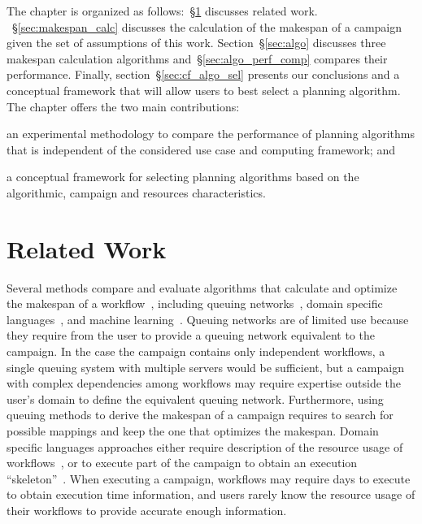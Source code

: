 The chapter is organized as follows:~\S\ref{sec:camp_rw} discusses related
work. ~\S\ref{sec:makespan_calc} discusses the
calculation of the makespan of a campaign given the set of assumptions of this
work. Section~\S\ref{sec:algo} discusses three makespan calculation algorithms
and~\S\ref{sec:algo_perf_comp} compares their performance. Finally,
section~\S\ref{sec:cf_algo_sel} presents our conclusions and a conceptual
framework that will allow users to best select a planning algorithm. The chapter
offers the two main contributions:
\begin{inparaenum}[(i)]
    \item an experimental methodology to compare the performance of planning
    algorithms that is independent of the considered use case and computing
    framework; and
    \item a conceptual framework for selecting planning algorithms based on the
    algorithmic, campaign and resources characteristics.
\end{inparaenum}


\section{Related Work}
\label{sec:camp_rw}

Several methods compare and evaluate algorithms that calculate and optimize the
makespan of a workflow~\cite{lu2019review}, including queuing
networks~\cite{yao2019throughput,bao2019performance}, domain specific
languages~\cite{carothers2017durango,maheshwari2016workflow}, and machine
learning~\cite{witt2019predictive,pumma2017runtime}. Queuing networks are of
limited use because they require from the user to provide a queuing network
equivalent to the campaign. In the case the campaign contains only independent
workflows, a single queuing system with multiple servers would be sufficient,
but a campaign with complex dependencies among workflows may require expertise
outside the user's domain to define the equivalent queuing network. Furthermore,
using queuing methods to derive the makespan of a campaign requires to search
for possible mappings and keep the one that optimizes the makespan. Domain
specific languages approaches either require description of the resource usage
of workflows~\cite{carothers2017durango}, or to execute part of the campaign to
obtain an execution ``skeleton''~\cite{maheshwari2016workflow}.
When executing a campaign, workflows may require days to execute to obtain
execution time information, and users rarely know the resource usage of their
workflows to provide accurate enough information.

